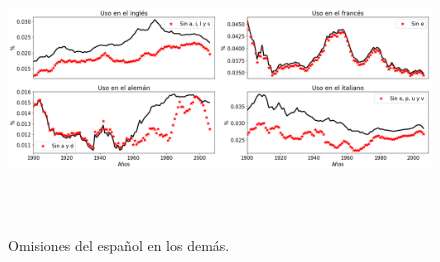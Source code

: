 \begin{figure}[h!]
	\centering
	\includegraphics[width=14cm, height=6.8cm]{Cap_5/OM_SP.png}
	\label{fig.OM_SP}
	\caption{Omisiones del español en los demás.}
\end{figure}


\newpage

